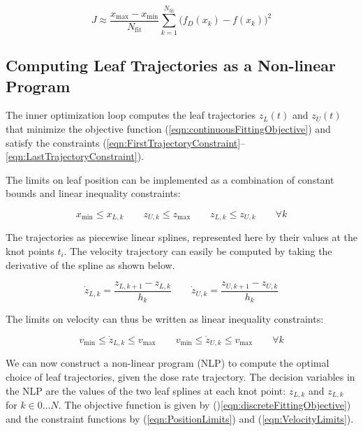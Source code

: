 \begin{equation}
  J \approx \frac{x_\text{max} - x_\text{min}}{N_\text{fit}}
  \sum_{k = 1}^{N_\text{fit}} \! \bigg( f_D(x_k) - f(x_k) \bigg)^2
  \label{eqn:discreteFittingObjective}
\end{equation}

\subsection{Computing Leaf Trajectories as a Non-linear Program}
\label{sec:LeafTrajectoryAsNLP}

The inner optimization loop computes the leaf trajectories $z_L(t)$ and $z_U(t)$
that minimize the objective function (\ref{eqn:continuousFittingObjective})
and satisfy the constraints (\ref{eqn:FirstTrajectoryConstraint}--\ref{eqn:LastTrajectoryConstraint}).

The limits on leaf position can be implemented as a combination of
constant bounds and linear inequality constraints:

\begin{equation}
  x_\text{min} \leq x_{L, k}
  \quad \quad
  z_{U, k} \leq z_\text{max}
  \quad \quad
  z_{L, k} \leq z_{U, k}
  \quad \quad
  \forall k
  \label{eqn:PositionLimits}
\end{equation}

The trajectories as piecewise linear splines, represented here by their values at the knot points $t_i$.
The velocity trajectory can easily be computed by taking the derivative of the spline as shown below.

\begin{equation}
  \dot{z}_{L, k} = \frac{z_{L, k+1} - z_{L, k}}{h_k}
  \quad \quad
  \dot{z}_{U, k} = \frac{z_{U, k+1} - z_{U, k}}{h_k}
\end{equation}

The limits on velocity can thus be written as linear inequality constraints:

\begin{equation}
  v_\text{min} \leq \dot{z}_{L, k} \leq v_\text{max}
  \quad \quad
  v_\text{min} \leq \dot{z}_{U, k} \leq v_\text{max}
  \quad \quad \forall k
  \label{eqn:VelocityLimits}
\end{equation}

We can now construct a non-linear program (NLP) to compute the optimal choice of leaf trajectories,
given the dose rate trajectory.
The decision variables in the NLP are the values of the two leaf splines at each knot point:
$z_{L, k}$ and $z_{L, k}$ for $k \in 0 \dots N$.
The objective function is given by ()\ref{eqn:discreteFittingObjective})
 and the constraint functions by (\ref{eqn:PositionLimits}) and (\ref{eqn:VelocityLimits}).

